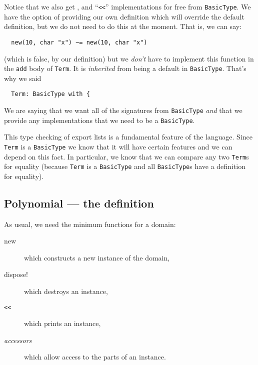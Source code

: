 Notice that we also get \ttin{\~{}=},  and ``\verb+<<+''
implementations for free from \verb"BasicType". We have the option of
providing our own definition which will override the default
definition, but we do not need to do this at the moment.  That is, we
can say:

\begin{small}
\begin{verbatim}
  new(10, char "x") ~= new(10, char "x")
\end{verbatim}
\end{small}

(which is false, by our definition) but we {\em don't} have to implement
this function in the \verb"add" body of \verb"Term". It is {\em inherited\/} from being a 
default in \verb"BasicType". That's why we said 

\begin{small}
\begin{verbatim}
  Term: BasicType with {
\end{verbatim}
\end{small}

We are saying that we want all of the signatures from \verb"BasicType" {\em and}
that we provide any implementations that we need to be a \verb"BasicType".

This type checking of export lists is a fundamental feature of the \asharp{} 
language. Since \verb"Term" is a \verb"BasicType" we know that it will have certain
features and we can depend on this fact. In particular, we know that
we can compare any two \verb"Term"s for equality (because \verb"Term" is a \verb"BasicType"
and all \verb"BasicType"s have a definition for equality).

\subsection{Polynomial --- the definition}

As usual, we need the minimum functions for a domain:

\begin{description}
\item[new]       which constructs a new instance of the domain,
\item[dispose!]   which destroys an instance,
\item[{\tt <<}]        which prints an instance,
\item[{\em accessors}] which allow access to the parts of an instance.
\end{description}

